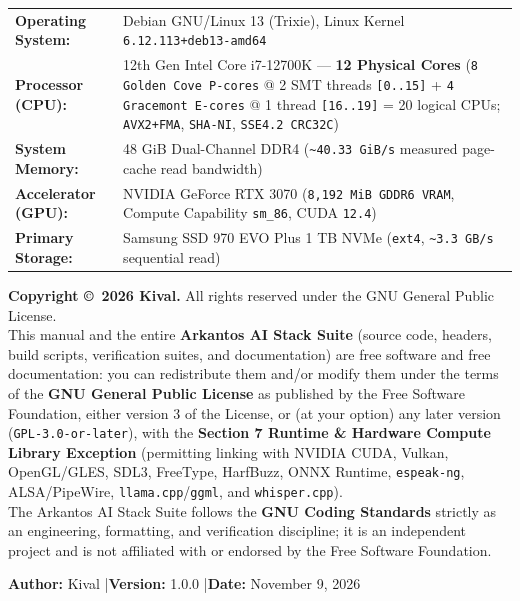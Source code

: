 \documentclass[11pt,a4paper]{article}
\begin{document}
\begin{titlepage}
\vspace{0.5cm}

\begin{tcolorbox}[colback=white,colframe=arkteal,title={\sffamily\bfseries Reference Hardware Profile (\texttt{Silver})}]
\small
\begin{tabularx}{\textwidth}{lY}
\textbf{Operating System:} & Debian GNU/Linux 13 (Trixie), Linux Kernel \texttt{6.12.113+deb13-amd64} \\
\textbf{Processor (CPU):} & 12th Gen Intel Core i7-12700K --- \textbf{12 Physical Cores} (\texttt{8 Golden Cove P-cores} @ 2 SMT threads \texttt{[0..15]} + \texttt{4 Gracemont E-cores} @ 1 thread \texttt{[16..19]} = 20 logical CPUs; \texttt{AVX2+FMA}, \texttt{SHA-NI}, \texttt{SSE4.2 CRC32C}) \\
\textbf{System Memory:} & 48 GiB Dual-Channel DDR4 (\texttt{\textasciitilde 40.33 GiB/s} measured page-cache read bandwidth) \\
\textbf{Accelerator (GPU):} & NVIDIA GeForce RTX 3070 (\texttt{8,192 MiB GDDR6 VRAM}, Compute Capability \texttt{sm\_86}, CUDA \texttt{12.4}) \\
\textbf{Primary Storage:} & Samsung SSD 970 EVO Plus 1 TB NVMe (\texttt{ext4}, \texttt{\textasciitilde 3.3 GB/s} sequential read)
\end{tabularx}
\end{tcolorbox}

\vfill

\begin{tcolorbox}[colback=arkgray,colframe=arkblue,title={\sffamily\bfseries Copyright \& GNU GPLv3+ Documentation License Notice}]
\footnotesize
\textbf{Copyright \copyright\ 2026 Kival.} All rights reserved under the GNU General Public License.\\[3pt]
This manual and the entire \textbf{Arkantos AI Stack Suite} (source code, headers, build scripts, verification suites, and documentation) are free software and free documentation: you can redistribute them and/or modify them under the terms of the \textbf{GNU General Public License} as published by the Free Software Foundation, either version 3 of the License, or (at your option) any later version (\texttt{GPL-3.0-or-later}), with the \textbf{Section 7 Runtime \& Hardware Compute Library Exception} (permitting linking with NVIDIA CUDA, Vulkan, OpenGL/GLES, SDL3, FreeType, HarfBuzz, ONNX Runtime, \texttt{espeak-ng}, ALSA/PipeWire, \texttt{llama.cpp}/\texttt{ggml}, and \texttt{whisper.cpp}).\\[3pt]
The Arkantos AI Stack Suite follows the \textbf{GNU Coding Standards} strictly as an engineering, formatting, and verification discipline; it is an independent project and is not affiliated with or endorsed by the Free Software Foundation.
\end{tcolorbox}

\vspace{0.3cm}
{\normalsize\sffamily \textbf{Author:} Kival \quad|\quad \textbf{Version:} 1.0.0 \quad|\quad \textbf{Date:} November 9, 2026\par}
\end{titlepage}
\end{document}
